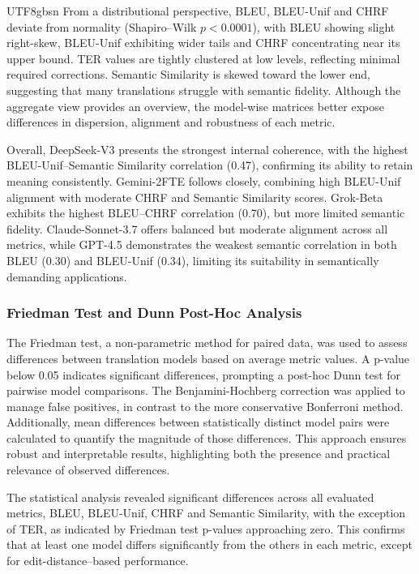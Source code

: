\documentclass[conference]{IEEEtran}
\begin{document}
\begin{CJK}{UTF8}{gbsn}
From a distributional perspective, BLEU, BLEU-Unif and CHRF deviate from normality (Shapiro–Wilk $p < 0.0001$), with BLEU showing slight right-skew, BLEU-Unif exhibiting wider tails and CHRF concentrating near its upper bound. TER values are tightly clustered at low levels, reflecting minimal required corrections. Semantic Similarity is skewed toward the lower end, suggesting that many translations struggle with semantic fidelity. Although the aggregate view provides an overview, the model-wise matrices better expose differences in dispersion, alignment and robustness of each metric.

Overall, DeepSeek-V3 presents the strongest internal coherence, with the highest BLEU-Unif–Semantic Similarity correlation (0.47), confirming its ability to retain meaning consistently. Gemini-2FTE follows closely, combining high BLEU-Unif alignment with moderate CHRF and Semantic Similarity scores. Grok-Beta exhibits the highest BLEU–CHRF correlation (0.70), but more limited semantic fidelity. Claude-Sonnet-3.7 offers balanced but moderate alignment across all metrics, while GPT-4.5 demonstrates the weakest semantic correlation in both BLEU (0.30) and BLEU-Unif (0.34), limiting its suitability in semantically demanding applications.


\subsubsection{Friedman Test and Dunn Post-Hoc Analysis}

The Friedman test, a non-parametric method for paired data, was used to assess differences between translation models based on average metric values. A p-value below 0.05 indicates significant differences, prompting a post-hoc Dunn test for pairwise model comparisons. The Benjamini-Hochberg correction was applied to manage false positives, in contrast to the more conservative Bonferroni method. Additionally, mean differences between statistically distinct model pairs were calculated to quantify the magnitude of those differences. This approach ensures robust and interpretable results, highlighting both the presence and practical relevance of observed differences.

The statistical analysis revealed significant differences across all evaluated metrics, BLEU, BLEU-Unif, CHRF and Semantic Similarity, with the exception of TER, as indicated by Friedman test p-values approaching zero. This confirms that at least one model differs significantly from the others in each metric, except for edit-distance–based performance.


\end{CJK}
\end{document}
